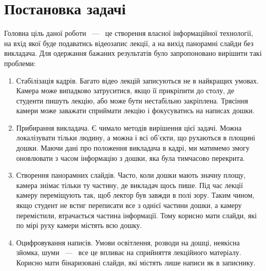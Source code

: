 \section{Постановка задачі}

Головна ціль даної роботи ~---~ це створення власної інформаційної технології,
на вхід якої буде подаватись відеозапис лекції, а на вихід панорамні слайди
без викладача.
Для одержання бажаних результатів було запропоновано
вирішити такі проблеми:
\begin{enumerate}
	\item
	      Стабілізація кадрів.
	      Багато відео лекцій записуються не в найкращих умовах.
	      Камера може випадково затруситися, якщо її прикріпити до столу,
	      де студенти пишуть лекцію, або може бути нестабільно закріплена.
	      Трясіння камери може заважати сприймати лекцію і фокусуватись на написах дошки.
	\item
	      Прибирання викладача.
	      Є чимало методів вирішення цієї задачі. Можна локалізувати тільки
	      людину, а можна і всі об'єкти, що рухаються в площині дошки. Маючи
	      дані про положення викладача в кадрі, ми матимемо змогу оновлювати
	      з часом інформацію з дошки, яка була тимчасово перекрита.

	\item
	      Створення панорамних слайдів.
	      Часто, коли дошки мають значну площу, камера знімає тільки ту частину, де
	      викладач щось пише. Під час лекції камеру переміщують так, щоб лектор був завжди
	      в полі зору. Таким чином, якщо студент не встиг переписати все з однієї частини
	      дошки, а камеру перемістили, втрачається частина інформації. Тому корисно
	      мати слайди, які по мірі руху камери містять всю дошку.

	\item
	      Оцифровування написів.
	      Умови освітлення, розводи на дошці, неякісна зйомка, шуми ~---~ все це впливає
	      на сприйняття лекційного матеріалу. Корисно мати бінаризовані слайди,
	      які містять лише написи як в записнику.
\end{enumerate}
